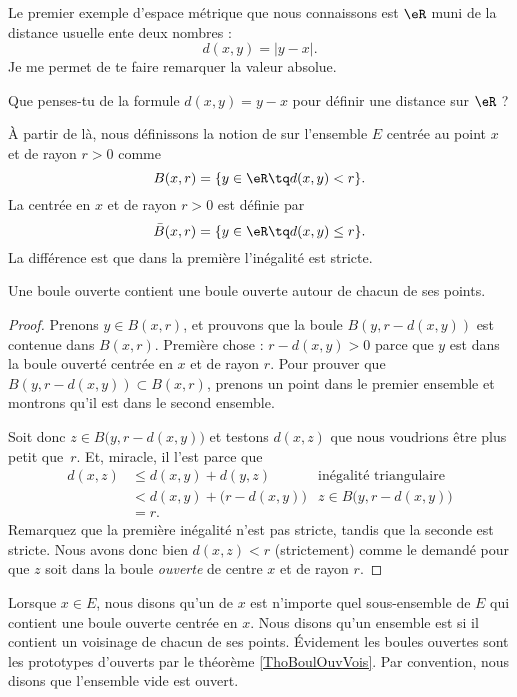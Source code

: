 Le premier exemple d'espace métrique que nous connaissons est $\eR$ muni de la distance usuelle ente deux nombres :
\begin{equation}
d(x,y)=| y-x |.
\end{equation}
Je me permet de te faire remarquer la valeur absolue.

\begin{exercice}
Que penses-tu de la formule $d(x,y)=y-x$ pour définir une distance sur $\eR$ ?
\end{exercice}

À partir de là, nous définissons la notion de  sur l'ensemble $E$ centrée au point $x$ et de rayon $r>0$ comme
\[
  B(x,r)=\{ y\in\eR\tq d(x,y)< r \}.
\]
La  centrée en $x$ et de rayon $r>0$ est définie par
\[
  \bar B(x,r)=\{ y\in\eR\tq d(x,y)\leq r \}.
\]
La différence est que dans la première l'inégalité est stricte.

\begin{theorem}		\label{ThoBoulOuvVois}
Une boule ouverte contient une boule ouverte autour de chacun de ses points.
\end{theorem}

\begin{proof}
Prenons $y\in B(x,r)$, et prouvons que la boule $B(y,r-d(x,y))$ est contenue dans $B(x,r)$. Première chose : $r-d(x,y)>0$ parce que $y$ est dans la boule ouverté centrée en $x$ et de rayon $r$. Pour prouver que  $B(y,r-d(x,y))\subset B(x,r)$, prenons un point dans le premier ensemble et montrons qu'il est dans le second ensemble.

Soit donc $z\in B\big(y,r-d(x,y)\big)$ et testons $d(x,z)$ que nous voudrions être plus petit que~$r$. Et, miracle, il l'est parce que
\begin{align*}
  d(x,z)	&\leq d(x,y)+d(y,z)&\text{inégalité triangulaire}\\
		&<d(x,y)+\big(r-d(x,y)\big)&\text{$z\in B\big(y,r-d(x,y)\big)$}\\
		&=r.
\end{align*}
Remarquez que la première inégalité n'est pas stricte, tandis que la seconde est stricte. Nous avons donc bien $d(x,z)<r$ (strictement) comme le demandé pour que $z$ soit dans la boule \emph{ouverte} de centre $x$ et de rayon $r$.
\end{proof}

Lorsque $x\in E$, nous disons qu'un  de $x$ est n'importe quel sous-ensemble de $E$ qui contient une boule ouverte centrée en $x$. Nous disons qu'un ensemble est  si il contient un voisinage de chacun de ses points. Évidement les boules ouvertes sont les prototypes d'ouverts par le théorème \ref{ThoBoulOuvVois}. Par convention, nous disons que l'ensemble vide est ouvert.

